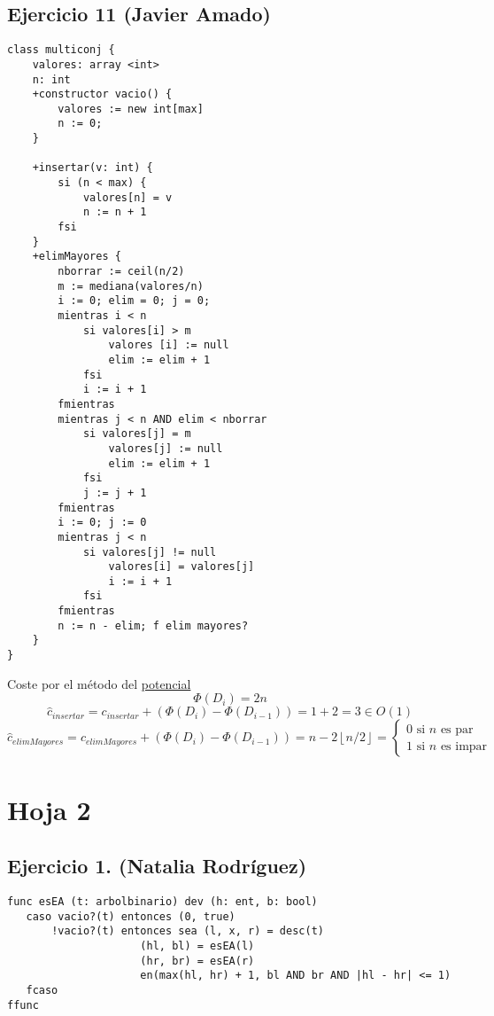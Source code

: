 \documentclass[10pt,a4paper,openright]{book}
\theoremstyle{break}
\begin{document}
\section{Ejercicio 11 (Javier Amado)}%
\label{sec:ejercicio_11}
\begin{lstlisting}
class multiconj {
    valores: array <int>
    n: int
    +constructor vacio() {
        valores := new int[max]
        n := 0;
    }

    +insertar(v: int) {
        si (n < max) {
            valores[n] = v
            n := n + 1
        fsi
    }
    +elimMayores {
        nborrar := ceil(n/2)
        m := mediana(valores/n)
        i := 0; elim = 0; j = 0;
        mientras i < n
            si valores[i] > m
                valores [i] := null
                elim := elim + 1
            fsi
            i := i + 1
        fmientras
        mientras j < n AND elim < nborrar
            si valores[j] = m
                valores[j] := null
                elim := elim + 1
            fsi 
            j := j + 1
        fmientras
        i := 0; j := 0
        mientras j < n
            si valores[j] != null
                valores[i] = valores[j]
                i := i + 1
            fsi
        fmientras
        n := n - elim; f elim mayores?
    }
}
\end{lstlisting}
Coste por el método del \underline{potencial} 
\[
\Phi\left( D_i \right) = 2n
\]\[
\hat{c}_{insertar} = c_{insertar} + \left( \Phi\left( D_i \right) - \Phi\left( D_{i-1} \right) \right) = 1 + 2 = 3 \in O\left( 1 \right) 
\]\[
\hat{c}_{elimMayores} = c_{elimMayores} + \left( \Phi\left( D_i \right) - \Phi\left( D_{i-1} \right)\right) = n - 2 \left\lfloor n/2 \right\rfloor = \begin{cases}
    0 \text{ si } n \text{ es par}\\
    1 \text{ si } n \text{ es impar} 
\end{cases} 
\]

\chapter{Hoja 2}%
\label{cha:hoja_2}
\section{Ejercicio 1. (Natalia Rodríguez)}%
\label{sec:ejercicio_1_natalia_rodriguez_}
\begin{lstlisting}
func esEA (t: arbolbinario) dev (h: ent, b: bool)
   caso vacio?(t) entonces (0, true)
       !vacio?(t) entonces sea (l, x, r) = desc(t)
                     (hl, bl) = esEA(l)
                     (hr, br) = esEA(r)
                     en(max(hl, hr) + 1, bl AND br AND |hl - hr| <= 1)
   fcaso
ffunc
\end{lstlisting}
\end{document}
